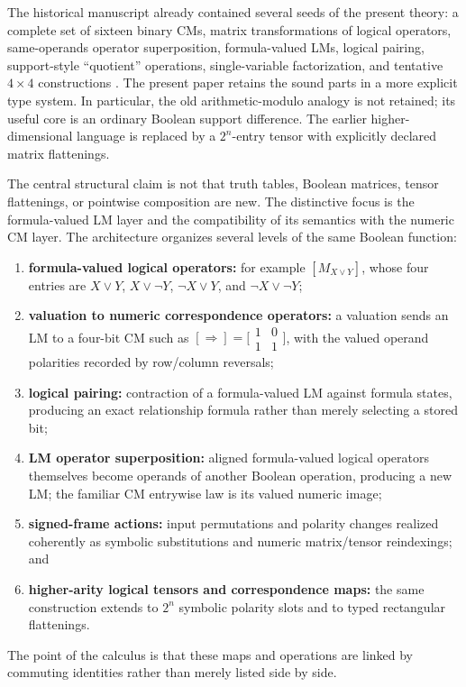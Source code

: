 \documentclass[11pt]{article}
\theoremstyle{definition}
\theoremstyle{remark}
\begin{document}
The historical manuscript already contained several seeds of the present theory: a complete set of sixteen binary CMs, matrix transformations of logical operators, same-operands operator superposition, formula-valued LMs, logical pairing, support-style ``quotient'' operations, single-variable factorization, and tentative $4\times4$ constructions \cite{Droncheff2018}.  The present paper retains the sound parts in a more explicit type system.  In particular, the old arithmetic-modulo analogy is not retained; its useful core is an ordinary Boolean support difference.  The earlier higher-dimensional language is replaced by a $2^n$-entry tensor with explicitly declared matrix flattenings.

The central structural claim is not that truth tables, Boolean matrices, tensor flattenings, or pointwise composition are new.  The distinctive focus is the formula-valued LM layer and the compatibility of its semantics with the numeric CM layer.  The architecture organizes several levels of the same Boolean function:
\begin{enumerate}
  \item \textbf{formula-valued logical operators:} for example $[M_{X\lor Y}]$, whose four entries are $X\lor Y$, $X\lor\neg Y$, $\neg X\lor Y$, and $\neg X\lor\neg Y$;
  \item \textbf{valuation to numeric correspondence operators:} a valuation sends an LM to a four-bit CM such as $[\Rightarrow]=\bigl[\begin{smallmatrix}1&0\\1&1\end{smallmatrix}\bigr]$, with the valued operand polarities recorded by row/column reversals;
  \item \textbf{logical pairing:} contraction of a formula-valued LM against formula states, producing an exact relationship formula rather than merely selecting a stored bit;
  \item \textbf{LM operator superposition:} aligned formula-valued logical operators themselves become operands of another Boolean operation, producing a new LM; the familiar CM entrywise law is its valued numeric image;
  \item \textbf{signed-frame actions:} input permutations and polarity changes realized coherently as symbolic substitutions and numeric matrix/tensor reindexings; and
  \item \textbf{higher-arity logical tensors and correspondence maps:} the same construction extends to $2^n$ symbolic polarity slots and to typed rectangular flattenings.
\end{enumerate}
The point of the calculus is that these maps and operations are linked by commuting identities rather than merely listed side by side.
\end{document}

